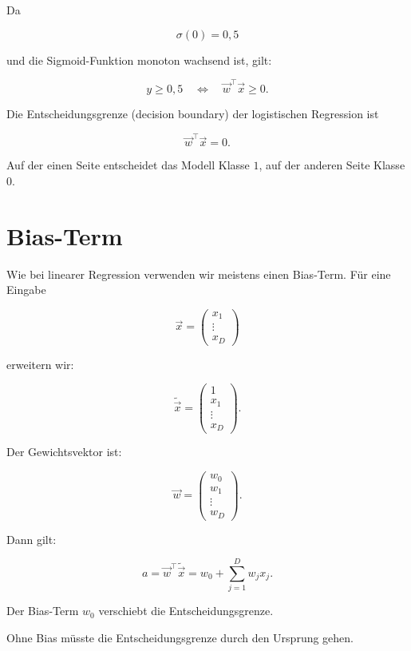 Da

\[
    \sigma(0)=0{,}5
\]

und die Sigmoid-Funktion monoton wachsend ist, gilt:

\[
    y \geq 0{,}5
    \quad
    \Longleftrightarrow
    \quad
    \vec{w}^{\top}\vec{x} \geq 0.
\]

\begin{conceptbox}
Die Entscheidungsgrenze (decision boundary) der logistischen Regression ist

\[
    \vec{w}^{\top}\vec{x}=0.
\]

Auf der einen Seite entscheidet das Modell Klasse \(1\), auf der anderen Seite Klasse \(0\).
\end{conceptbox}

\section{Bias-Term}

Wie bei linearer Regression verwenden wir meistens einen Bias-Term.
Für eine Eingabe

\[
    \vec{x}
    =
    \begin{pmatrix}
        x_1 \\
        \vdots \\
        x_D
    \end{pmatrix}
\]

erweitern wir:

\[
    \tilde{\vec{x}}
    =
    \begin{pmatrix}
        1 \\
        x_1 \\
        \vdots \\
        x_D
    \end{pmatrix}.
\]

Der Gewichtsvektor ist:

\[
    \vec{w}
    =
    \begin{pmatrix}
        w_0 \\
        w_1 \\
        \vdots \\
        w_D
    \end{pmatrix}.
\]

Dann gilt:

\[
    a
    =
    \vec{w}^{\top}\tilde{\vec{x}}
    =
    w_0+\sum_{j=1}^{D}w_jx_j.
\]

\begin{notebox}
Der Bias-Term \(w_0\) verschiebt die Entscheidungsgrenze.

Ohne Bias müsste die Entscheidungsgrenze durch den Ursprung gehen.
\end{notebox}


